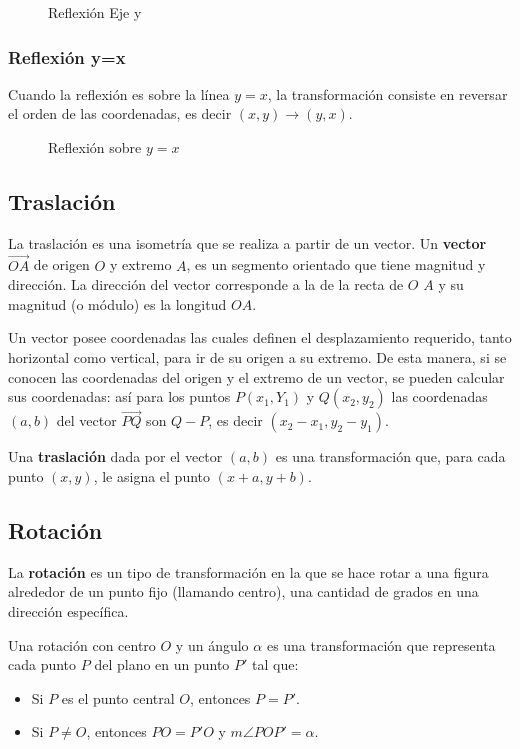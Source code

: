 \begin{figure}[h]
    \centering
    
    \caption{Reflexión Eje y}
    \label{fig:reflexion-x-axis}
\end{figure}

\subsubsection{Reflexión y=x}

Cuando la reflexión es sobre la línea $y=x$, la transformación consiste en reversar el orden de las coordenadas, es decir $(x,y) \to (y,x)$.

\begin{figure}[h]
    \centering
    
    \caption{Reflexión sobre $y=x$}
    \label{fig:reflexion-y-x}
\end{figure}

\clearpage

\subsection{Traslación}

La traslación es una isometría que se realiza a partir de un vector. Un \textbf{vector} $\overrightarrow{OA}$ de origen $O$ y extremo $A$, es un segmento orientado que tiene magnitud y dirección. La dirección del vector corresponde a la de la recta de $O$ $A$ y su magnitud (o módulo) es la longitud $OA$.

Un vector posee coordenadas las cuales definen el desplazamiento requerido, tanto horizontal como vertical, para ir de su origen a su extremo. De esta manera, si se conocen las coordenadas del origen y el extremo de un vector, se pueden calcular sus coordenadas: así para los puntos $P(x_1,Y_1)$ y $Q(x_2,y_2)$ las coordenadas $(a,b)$ del vector $\overrightarrow{PQ}$ son $Q-P$, es decir $(x_2-x_1,y_2-y_1)$.

Una \textbf{traslación} dada por el vector $(a,b)$ es una transformación que, para cada punto $(x,y)$, le asigna el punto $(x + a, y + b)$.

\subsection{Rotación}

La \textbf{rotación} es un tipo de transformación en la que se hace rotar a una figura alrededor de un punto fijo (llamando centro), una cantidad de grados en una dirección específica.

Una rotación con centro $O$ y un ángulo $\alpha$ es una transformación que representa cada punto $P$ del plano en un punto $P'$ tal que:

\begin{itemize}
    \item Si $P$ es el punto central $O$, entonces $P = P'$.
    \item Si $P \neq O$, entonces $PO = P'O$ y $m\angle{POP'} = \alpha$.
\end{itemize}